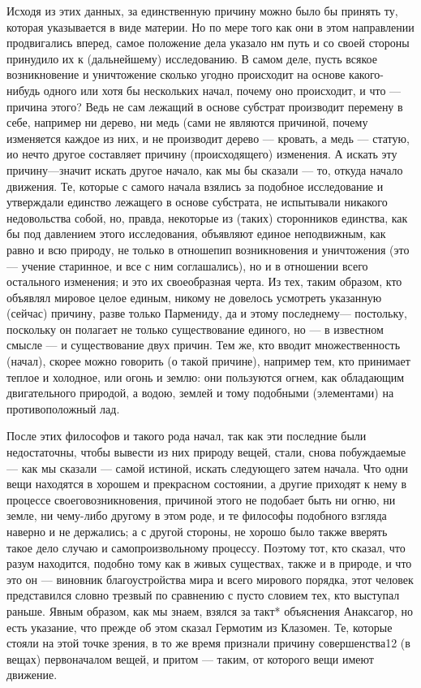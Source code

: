 \documentclass{article}
\begin{document}
Исходя из этих данных, за единственную причину можно было бы принять ту, которая указывается в виде материи. Но по мере того как они в этом направлении продвигались вперед, самое положение дела указало нм путь и со своей стороны принудило их к (дальнейшему) исследованию. В самом деле, пусть всякое возникновение и уничтожение сколько угодно происходит на основе какого-нибудь одного или хотя бы нескольких начал, почему оно происходит, и что — причина этого? Ведь не сам лежащий в основе субстрат производит перемену в себе, например ни дерево, ни медь (сами не являются причиной, почему изменяется каждое из них, и не производит дерево — кровать, а медь — статую, ио нечто другое составляет причину (происходящего) изменения. А искать эту причину—значит искать другое начало, как мы бы сказали — то, откуда начало движения. Те, которые с самого начала взялись за подобное исследование и утверждали единство лежащего в основе субстрата, не испытывали никакого недовольства собой, но, правда, некоторые из (таких) сторонников единства, как бы под давлением этого исследования, объявляют единое неподвижным, как равно и всю природу, не только в отношепип возникновения и уничтожения (это — учение старинное, и все с ним соглашались), но и в отношении всего остального изменения; и это их своеобразная черта. Из тех, таким образом, кто объявлял мировое целое единым, никому не довелось усмотреть указанную (сейчас) причину,
\footnotemark[15]
разве только Пармениду, да и этому последнему— постольку, поскольку он полагает не только существование единого, но — в известном смысле — и существование двух причин.
\footnotemark[16]
Тем же, кто вводит множественность (начал), скорее можно говорить (о такой причине), например тем, кто принимает теплое и холодное, или огонь и землю: они пользуются огнем, как обладающим двигательного природой, а водою, землей и тому подобными (элементами) на противоположный лад.

После этих философов и такого рода начал, так как эти последние были недостаточны, чтобы вывести из них природу вещей, стали, снова побуждаемые — как мы сказали — самой истиной, искать следующего затем начала. Что одни вещи находятся в хорошем и прекрасном состоянии, а другие приходят к нему в процессе своеговозникновения, причиной этого не подобает быть ни огню, ни земле, ни чему-либо другому в этом роде, и те философы подобного  взгляда наверно и не держались; а с другой стороны, не хорошо было также вверять такое дело случаю и самопроизвольному процессу. Поэтому тот, кто сказал, что разум находится, подобно тому как в живых существах, также и в природе, и что это он — виновник благоустройства мира и всего мирового порядка, этот человек представился словно трезвый по сравнению с пусто словием тех, кто выступал раньше. Явным образом, как мы знаем, взялся за такт* объяснения Анаксагор, но есть указание, что прежде об этом сказал Гермотим из Клазомен.
\footnotemark[17]
Те, которые стояли на этой точке зрения, в то же время признали причину совершенства12  (в вещах) первоначалом вещей, и притом — таким, от которого вещи имеют движение.
\end{document}
